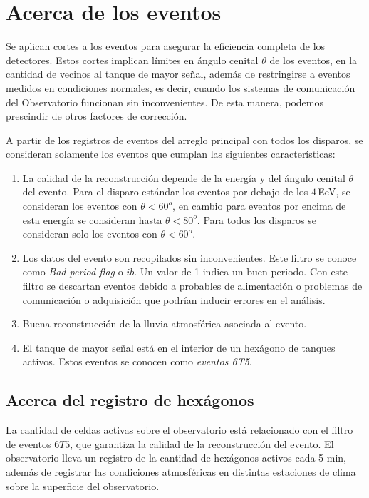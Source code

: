 \section{Acerca de los eventos} \label{filtro}

Se aplican cortes a los eventos para asegurar la eficiencia completa de los detectores. Estos cortes implican límites en ángulo cenital $\theta$ de los eventos, en la cantidad de vecinos al tanque de mayor señal, además de restringirse a eventos medidos en condiciones normales, es decir, cuando los sistemas de comunicación del Observatorio funcionan sin inconvenientes. De esta manera, podemos prescindir de otros factores de corrección.

A partir de los registros de eventos del arreglo principal con todos los disparos, se consideran solamente los eventos que cumplan las siguientes características:

    \begin{enumerate}
      \item La calidad de la reconstrucción depende de la energía y del ángulo cenital $\theta$ del evento.  Para el disparo estándar los eventos por debajo de los $4\,$EeV, se consideran los eventos con $\theta < 60^o$, en cambio para eventos por encima de esta energía se consideran hasta $\theta < 80^o$. Para todos los disparos se consideran solo los eventos con $\theta<60^o$.
      \item Los datos del evento son recopilados sin inconvenientes. Este filtro se conoce como \emph{Bad period flag} o $ib$. Un valor de 1 indica un buen periodo. Con este filtro se descartan eventos debido a probables de alimentación o problemas de comunicación o adquisición que podrían inducir errores en el análisis.
      \item Buena reconstrucción de la lluvia atmosférica asociada al evento.
      \item El tanque de mayor señal está en el interior de un hexágono de tanques activos. Estos eventos se conocen como \textit{eventos 6T5}.
    \end{enumerate}


\subsection{Acerca del registro de hexágonos}\label{hexagonos_rate}

La cantidad de celdas  activas sobre el observatorio está relacionado con el filtro de eventos $6T5$, que garantiza la calidad de la reconstrucción del evento. El observatorio lleva un registro de la cantidad de hexágonos activos cada 5 min, además de registrar las condiciones atmosféricas en distintas estaciones de clima sobre la superficie del observatorio. 


